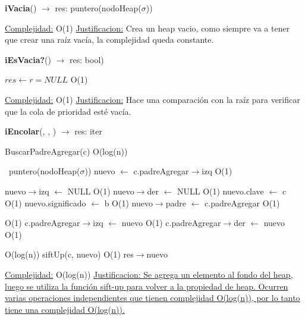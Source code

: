 \begin{Representacion}
\begin{Algoritmos}
\begin{algorithm}[H]{\textbf{iVacia}() $\to$ res: puntero(nodoHeap($\sigma$))}
\begin{algorithmic}[1]
		\medskip
		\Statex \underline{Complejidad:} O(1)
			\Statex \underline{Justificacion:} Crea un heap vacio, como siempre va a tener que crear una raíz vacía, la complejidad queda constante.
	\end{algorithmic}
\end{algorithm}


\begin{algorithm}[H]{\textbf{iEsVacia?}() $\to$ res: bool)}
	\begin{algorithmic}[1]
		\State $res \gets r = NULL$ \Comment O(1)
		
		\medskip
		\Statex \underline{Complejidad:} O(1)
			\Statex \underline{Justificacion:} Hace una comparación con la raíz para verificar que la cola de prioridad esté vacía.
	\end{algorithmic}
\end{algorithm}

\begin{algorithm}[H]{\textbf{iEncolar}(, , ) $\to$ res: iter}
	\begin{algorithmic}[1]

		\State BuscarPadreAgregar(c) \Comment O(log(n))
		
		\ puntero(nodoHeap($\sigma$)) nuevo $\leftarrow$ c.padreAgregar$\rightarrow$izq	\Comment O(1)

		\State nuevo$\rightarrow$izq $\leftarrow$ NULL \Comment O(1)
		\State nuevo$\rightarrow$der $\leftarrow$ NULL \Comment O(1)
		\State nuevo.clave $\leftarrow$ c \Comment O(1)
		\State nuevo.significado $\leftarrow$ b \Comment O(1)
		\State nuevo$\rightarrow$padre $\leftarrow$ c.padreAgregar \Comment O(1)
				
		 \Comment O(1)
			\State c.padreAgregar$\rightarrow$izq $\leftarrow$ nuevo \Comment O(1)
		\Else
			\State c.padreAgregar$\rightarrow$der $\leftarrow$ nuevo \Comment O(1)
		\EndIf

				
		 \Comment O(log(n))
			\State siftUp(c, nuevo)	\Comment O(1)
		\EndWhile			
		\State res$\rightarrow$nuevo
		
		
		\medskip
		\Statex \underline{Complejidad:} O(log(n))
			\Statex \underline{Justificacion: Se agrega un elemento al fondo del heap, luego se utiliza la función sift-up para volver a la propiedad de heap. Ocurren varias operaciones independientes que tienen complejidad O(log(n)), por lo tanto tiene una complejidad O(log(n)).}  
	\end{algorithmic}
\end{algorithm}




\end{Algoritmos}
\end{Representacion}
